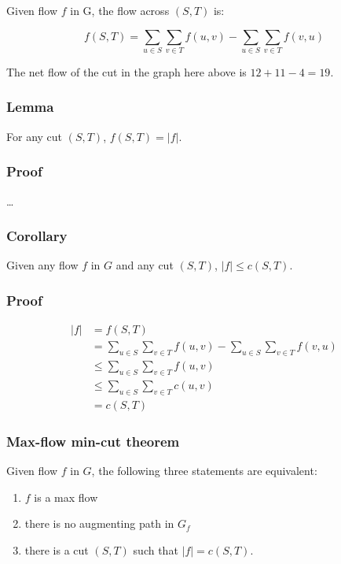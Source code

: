 \documentclass[12pt]{article}
\begin{document}
Given flow $f$ in G, the flow across $(S,T)$ is:

  $$ f(S,T) = \sum_{u \in S}\sum_{v \in T} f(u, v) -  \sum_{u \in S}\sum_{v \in T} f(v, u)$$

The net flow of the cut in the graph here above is $12 + 11 - 4 = 19$.

\subsubsection*{\color{blue}Lemma}

For any cut $(S, T)$, $f(S,T) = |f|$.

\subsubsection*{\color{red}Proof}

\dots

\subsubsection*{\color{blue}Corollary}

Given any flow $f$ in $G$ and any cut $(S, T)$, $|f| \leq c(S, T)$. 

\subsubsection*{\color{red}Proof}

\begin{align*}
  |f| &=    f(S,T) \\
      &=    \sum_{u \in S}\sum_{v \in T} f(u, v) -  \sum_{u \in S}\sum_{v \in T} f(v, u)\\
      &\leq \sum_{u \in S}\sum_{v \in T} f(u, v)\\
      &\leq \sum_{u \in S}\sum_{v \in T} c(u, v)\\
      &=c(S,T)
\end{align*}

\subsubsection*{Max-flow min-cut theorem}

Given flow $f$ in $G$, the following three statements are equivalent:

\begin{enumerate}
  \item $f$ is a max flow
  \item there is no augmenting path in $G_f$
  \item there is a cut $(S,T)$ such that $|f| = c(S, T)$.
\end{enumerate}
\end{document}
